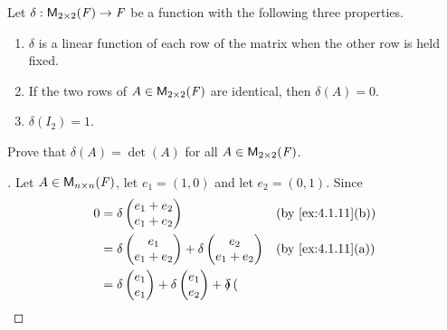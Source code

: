 \begin{ex}\label{ex:4.1.11}
  Let \(\delta : \mathsf{M}_{{2} \times 2}({\mathit{F}}) \to \mathit{F}\) be a function with the following three properties.
  \begin{enumerate}
    \item \(\delta\) is a linear function of each row of the matrix when the other row is held fixed.
    \item If the two rows of \(A \in \mathsf{M}_{{2} \times 2}({\mathit{F}})\) are identical, then \(\delta(A) = 0\).
    \item \(\delta(I_2) = 1\).
  \end{enumerate}
  Prove that \(\delta(A) = \det(A)\) for all \(A \in \mathsf{M}_{{2} \times 2}({\mathit{F}})\).
\end{ex}

\begin{proof}[]
  Let \(A \in \mathsf{M}_{{n} \times n}({\mathit{F}})\), let \(e_1 = (1, 0)\) and let \(e_2 = (0, 1)\).
  Since
  \begin{align*}
    0 & = \delta\begin{pmatrix}
                  e_1 + e_2 \\
                  e_1 + e_2
                \end{pmatrix}               &  & \text{(by \cref{ex:4.1.11}(b))}                                                     \\
      & = \delta\begin{pmatrix}
                  e_1 \\
                  e_1 + e_2
                \end{pmatrix} + \delta\begin{pmatrix}
                                        e_2 \\
                                        e_1 + e_2
                                      \end{pmatrix} &  & \text{(by \cref{ex:4.1.11}(a))}                                             \\
      & = \delta\begin{pmatrix}
                  e_1 \\
                  e_1
                \end{pmatrix} + \delta\begin{pmatrix}
                                        e_1 \\
                                        e_2
                                      \end{pmatrix} + \delta\begin{pmatrix}

\end{pmatrix}
\end{align*}
\end{proof}
